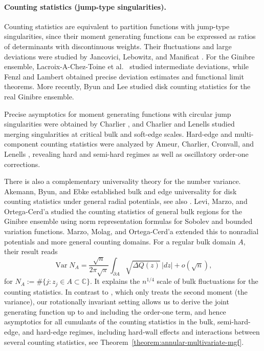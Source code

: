 \documentclass[a4paper]{article}
\newcommand{\C}{\mathbb{C}}
\numberwithin{equation}{section}
\begin{document}
\paragraph{Counting statistics (jump-type singularities).}
Counting statistics are equivalent to partition functions with jump-type singularities, since their moment generating functions can be expressed as ratios of determinants with discontinuous weights. Their fluctuations and large deviations were studied by Jancovici, Lebowitz, and Manificat \cite{JLM1993}. For the Ginibre ensemble, Lacroix-A-Chez-Toine et al.\ \cite{L et al 2019} studied intermediate deviations, while Fenzl and Lambert \cite{FenzlLambert} obtained precise deviation estimates and functional limit theorems. More recently, Byun and Lee \cite{BL2026} studied disk counting statistics for the real Ginibre ensemble.

Precise asymptotics for moment generating functions with circular jump singularities were obtained by Charlier \cite{C2021 FH}, and Charlier and Lenells \cite{CL2023} studied merging singularities at critical bulk and soft-edge scales. Hard-edge and multi-component counting statistics were analyzed by Ameur, Charlier, Cronvall, and Lenells \cite{ACCL1,ACCL2}, revealing hard and semi-hard regimes as well as oscillatory order-one corrections. %
 

There is also a complementary universality theory for the number variance.
Akemann, Byun, and Ebke \cite{ABE2023} established bulk and edge
universality for disk counting statistics under general radial potentials, see also \citep{ABES2023}.
Levi, Marzo, and Ortega-Cerd'{a} \cite{LMO2024} studied the counting statistics of general bulk regions for the Ginibre ensemble using norm representation formulas for Sobolev and bounded variation functions. Marzo, Molag, and Ortega-Cerd'{a} \cite{MMO25} extended this to nonradial potentials and more general counting domains. For a regular bulk domain $A$, their result reads
\[
\operatorname{Var} N_A
=\frac{\sqrt n}{2\pi\sqrt\pi}
  \int_{\partial A}\sqrt{\Delta Q(z)}\,|dz|+o(\sqrt n),
\]
for $N_A:=\#\{j:z_j\in A\subset\C\}$.
It explains the $n^{1/4}$ scale of bulk fluctuations for the counting statistics.  
In contrast to \cite{MMO25}, which only treats the second moment (the variance), our rotationally invariant setting allows us to derive the joint generating function up to and including the order-one term, and hence asymptotics for all cumulants of the counting statistics in the bulk, semi-hard-edge, and hard-edge regimes, including hard-wall effects and interactions between several counting statistics, see Theorem~\ref{theorem:annular-multivariate-mgf}.
\end{document}
